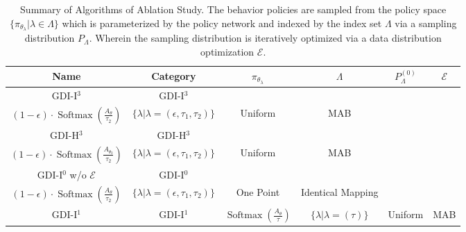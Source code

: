 \documentclass[nohyperref]{article}
\theoremstyle{plain}
\begin{document}
\begin{table}[H]
\begin{center}
\caption{Summary of Algorithms of Ablation Study. The behavior policies are sampled from the policy space $\{\pi_{\theta_{\lambda}} | \lambda \in \Lambda\}$ which is parameterized by the policy network and indexed by the index set $\Lambda$ via a sampling distribution $P_{\Lambda}$. Wherein the sampling distribution is iteratively optimized via a data distribution optimization $\mathcal{E}$.}
\begin{tabular}{|c| c| c| c| c| c|}
\hline
\textbf{Name}               & \textbf{Category}          &$\pi_{\theta_{\lambda}}$       & $\Lambda$                                                  & $P_{\Lambda}^{(0)}$ & $\mathcal{E}$  \\
\hline
GDI-I$^{3}$                 &   GDI-I$^3$              & \makecell[c]{$\epsilon \cdot \operatorname{Softmax}\left(\frac{A_{\theta}}{\tau_{1}}\right)+$\\$(1-\epsilon) \cdot \operatorname{Softmax}\left(\frac{A_{\theta}}{\tau_{2}}\right)$} &$ \{\lambda| \lambda =(\epsilon,\tau_1,\tau_2)\}$  & Uniform              & MAB\\
\hline
GDI-H$^{3}$                 &   GDI-H$^3$              &  \makecell[c]{$\epsilon \cdot \operatorname{Softmax}\left(\frac{A_{\theta_1}}{\tau_{1}}\right)+$\\$(1-\epsilon) \cdot \operatorname{Softmax}\left(\frac{A_{\theta_2}}{\tau_{2}}\right)$}         &$ \{\lambda| \lambda =(\epsilon,\tau_1,\tau_2)\}$  & Uniform              & MAB\\
\hline
GDI-I$^0$ w/o  $\mathcal{E}$&   GDI-I$^0$              & \makecell[c]{$\epsilon \cdot \operatorname{Softmax}\left(\frac{A_{\theta}}{\tau_{1}}\right)+$\\$(1-\epsilon) \cdot \operatorname{Softmax}\left(\frac{A_{\theta}}{\tau_{2}}\right)$}   &$ \{\lambda| \lambda =(\epsilon,\tau_1,\tau_2)\}$  & One Point           & Identical Mapping\\
\hline
GDI-I$^1$         &   GDI-I$^1$                        & $  \operatorname{Softmax}\left(\frac{A_{\theta}}{\tau}\right)$ &$ \{\lambda| \lambda =(\tau)\}$                    & Uniform              & MAB\\
\hline
\end{tabular}
\end{center}
\label{tab:Summary of Algorithms of Ablation Study}
\end{table}
\end{document}
